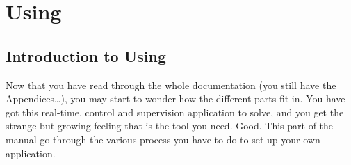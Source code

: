 
\part{Using \COPRS{}}



\chapter{Introduction to Using \COPRS{}}

Now that you have read through the whole documentation (you still have the
Appendices\dots), you may start to wonder how the different parts fit in.  You
have got this real-time, control and supervision application to solve, and you
get the strange but growing feeling that \COPRS{} is the tool you need.  Good.
This part of the manual go through the various process you have to do to set up
your own application.


